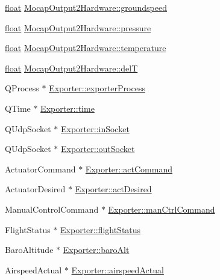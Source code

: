 \begin{DoxyCompactItemize}
\item 
\hyperlink{_super_l_u_support_8h_a6a1bb6ed41f44b60e7bd83b0e9945aa7}{float} \hyperlink{group___mo_cap_plugin_gab0735b3db4133ae25e01a4ee6dc3347f}{Mocap\-Output2\-Hardware\-::groundspeed}
\item 
\hyperlink{_super_l_u_support_8h_a6a1bb6ed41f44b60e7bd83b0e9945aa7}{float} \hyperlink{group___mo_cap_plugin_ga521e946322d097a3b14b24f53ce1568f}{Mocap\-Output2\-Hardware\-::pressure}
\item 
\hyperlink{_super_l_u_support_8h_a6a1bb6ed41f44b60e7bd83b0e9945aa7}{float} \hyperlink{group___mo_cap_plugin_gaa66ae80cf0902b622dea302a9a588fe8}{Mocap\-Output2\-Hardware\-::temperature}
\item 
\hyperlink{_super_l_u_support_8h_a6a1bb6ed41f44b60e7bd83b0e9945aa7}{float} \hyperlink{group___mo_cap_plugin_ga0c6d6722adb60229659cfe26d61ec953}{Mocap\-Output2\-Hardware\-::del\-T}
\item 
Q\-Process $\ast$ \hyperlink{group___mo_cap_plugin_ga3e0f59d7efdaba4ae56afc474e929a17}{Exporter\-::exporter\-Process}
\item 
Q\-Time $\ast$ \hyperlink{group___mo_cap_plugin_gac71372aac301b0f6d2ae67c3a5c4be63}{Exporter\-::time}
\item 
Q\-Udp\-Socket $\ast$ \hyperlink{group___mo_cap_plugin_ga01c0037d3abe6f3cfc9521e865cbe65f}{Exporter\-::in\-Socket}
\item 
Q\-Udp\-Socket $\ast$ \hyperlink{group___mo_cap_plugin_gad4adc615f73413f479e48983cce6f3e0}{Exporter\-::out\-Socket}
\item 
Actuator\-Command $\ast$ \hyperlink{group___mo_cap_plugin_gaaa8cd64f3935d77113b41cf84f398e78}{Exporter\-::act\-Command}
\item 
Actuator\-Desired $\ast$ \hyperlink{group___mo_cap_plugin_ga480be6f8874e252461095878c7b41d08}{Exporter\-::act\-Desired}
\item 
Manual\-Control\-Command $\ast$ \hyperlink{group___mo_cap_plugin_ga8855725831e82f6e02e0caba72c0dd7b}{Exporter\-::man\-Ctrl\-Command}
\item 
Flight\-Status $\ast$ \hyperlink{group___mo_cap_plugin_ga63bef489a0fb9ccf02eadc577d487c10}{Exporter\-::flight\-Status}
\item 
Baro\-Altitude $\ast$ \hyperlink{group___mo_cap_plugin_ga15711fcb53727148f4c62b5bfa1ce9f1}{Exporter\-::baro\-Alt}
\item 
Airspeed\-Actual $\ast$ \hyperlink{group___mo_cap_plugin_ga933ba2309643df8ddd342ae4cf010fca}{Exporter\-::airspeed\-Actual}
\item 

\end{DoxyCompactItemize}
